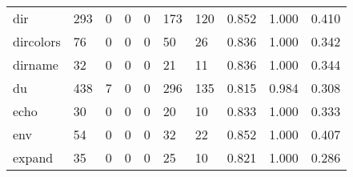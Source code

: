 \begin{longtable}{lp{1.3cm}p{1.3cm}p{1.3cm}p{1.3cm}p{1.3cm}p{1.3cm}p{1.3cm}p{1.3cm}p{1.3cm}}
dir       &                    293 &                                             0 &                                            0 &                                           0 &                                          173 &                                        120 &                                0.852 &                                  1.000 &                                0.410 \\
dircolors &                     76 &                                             0 &                                            0 &                                           0 &                                           50 &                                         26 &                                0.836 &                                  1.000 &                                0.342 \\
dirname   &                     32 &                                             0 &                                            0 &                                           0 &                                           21 &                                         11 &                                0.836 &                                  1.000 &                                0.344 \\
du        &                    438 &                                             7 &                                            0 &                                           0 &                                          296 &                                        135 &                                0.815 &                                  0.984 &                                0.308 \\
echo      &                     30 &                                             0 &                                            0 &                                           0 &                                           20 &                                         10 &                                0.833 &                                  1.000 &                                0.333 \\
env       &                     54 &                                             0 &                                            0 &                                           0 &                                           32 &                                         22 &                                0.852 &                                  1.000 &                                0.407 \\
expand    &                     35 &                                             0 &                                            0 &                                           0 &                                           25 &                                         10 &                                0.821 &                                  1.000 &                                0.286 \\

\end{longtable}
